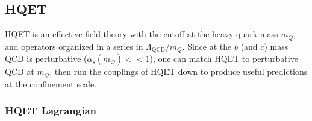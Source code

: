 
\subsection{HQET}

HQET \cite{Georgi:1990um} is an effective field theory with the cutoff at the heavy quark mass $m_Q$, and operators organized in a series in $\Lambda_{\text{QCD}}/m_Q$. Since at the $b$ (and $c$) mass QCD is perturbative ($\alpha_s(m_Q) << 1$), one can match HQET to perturbative QCD at $m_Q$, then run the couplings of HQET down to produce useful predictions at the confinement scale.


\subsubsection{HQET Lagrangian}

